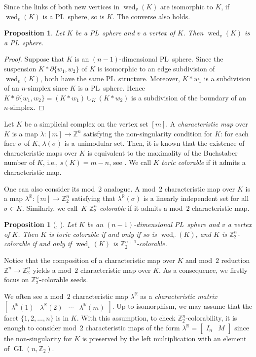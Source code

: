\documentclass[11pt]{amsart}
\theoremstyle{plain}
\newtheorem{proposition}[theorem]{Proposition}
\numberwithin{equation}{section}
\theoremstyle{definition}
\newcommand{\R}{\mathbb{R}}
\newcommand{\Z}{\mathbb{Z}}
\DeclareMathOperator{\GL}{GL}
\DeclareMathOperator{\wed}{wed}
\begin{document}
Since the links of both new vertices in $\wed_{v}(K)$ are isomorphic to $K$, if $\wed_{v}(K)$ is a PL~sphere, so is $K$.
The converse also holds.

\begin{proposition}
	Let $K$ be a PL~sphere and $v$ a vertex of $K$.
	Then $\wed_{v}(K)$ is a PL~sphere.
\end{proposition}
\begin{proof}
	Suppose that $K$ is an $(n-1)$-dimensional PL~sphere.
	Since the suspension $K \ast \partial \{w_1, w_2\}$ of $K$ is isomorphic to an edge subdivision of $\wed_{v}(K)$, both have the same PL~structure.
	Moreover, $K \ast w_1$ is a subdivision of an $n$-simplex since $K$ is a PL~sphere. Hence $ K \ast \partial \{w_1, w_2\} = (K \ast w_1) \cup_K (K \ast w_2)$ is a subdivision of the boundary of an $n$-simplex.
\end{proof}

Let $K$ be a simplicial complex on the vertex set $[m]$.
A \emph{characteristic map} over $K$ is a map $\lambda \colon [m] \longrightarrow \Z^n$ satisfying the non-singularity condition for $K$: for each face $\sigma$ of $K$, $\lambda(\sigma)$ is a unimodular set.
Then, it is known that the existence of characteristic maps over $K$ is equivalent to the maximality of the Buchstaber number of $K$, i.e., $s(K) = m-n$, see \cite{Buchstaber-Panov2015}.
We call $K$ \emph{toric colorable} if it admits a characteristic map.

One can also consider its mod~$2$ analogue.
A mod~$2$ characteristic map over $K$ is a map $\lambda^\R \colon [m] \longrightarrow \Z_2^{n}$ satisfying that $\lambda^\R(\sigma)$ is a linearly independent set for all $\sigma \in K$.
Similarly, we call~$K$ \emph{$\Z_2^n$-colorable} if it admits a mod~$2$ characteristic map.

\begin{proposition}[\cite{ewald1996combinatorial}, \cite{Choi-Park2016}]
	Let $K$ be an $(n-1)$-dimensional PL~sphere and $v$ a vertex of $K$.
	Then $K$ is toric colorable if and only if so is $\wed_{v}(K)$, and $K$ is $\Z_2^n$-colorable if and only if $\wed_{v}(K)$ is $\Z_2^{n+1}$-colorable.
\end{proposition}

Notice that the composition of a characteristic map over $K$ and mod~$2$ reduction $\Z^n \to \Z_2^n$ yields a mod~$2$ characteristic map over $K$.
As a consequence, we firstly focus on $\Z_2^n$-colorable seeds.

We often see a mod~$2$ characteristic map $\lambda^\R$ as a \emph{characteristic matrix} $\begin{bmatrix} \lambda^\R(1) & \lambda^\R(2) & \cdots & \lambda^\R(m) \end{bmatrix}$.
Up to isomorphism, we may assume that the facet $\{1, 2, \ldots, n\}$ is in $K$.
With this assumption, to check $\Z_2^n$-colorability, it is enough to consider mod~$2$ characteristic maps of the form $\lambda^\R = \begin{bmatrix} I_n & M \end{bmatrix}$ since the non-singularity for $K$ is preserved by the left multiplication with an element of $\GL(n, \Z_2)$.
\end{document}
